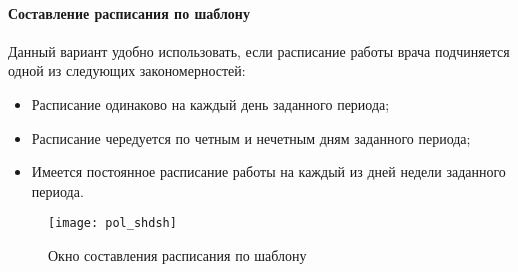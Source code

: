 \paragraph{Составление расписания по шаблону} \label{pol_shdsh}

Данный вариант удобно использовать, если расписание работы врача подчиняется одной из следующих закономерностей:
\begin{itemize}
 \item Расписание одинаково на каждый день заданного периода;
 \item Расписание чередуется по четным и нечетным дням заданного периода;
 \item Имеется постоянное расписание работы на каждый из дней недели заданного периода.
\end{itemize}
 
\begin{figure}[ht]\centering
 \texttt{[image: pol\_shdsh]}
 \caption{Окно составления расписания по шаблону}
 \label{img_pol_shdsh}
\end{figure} 


